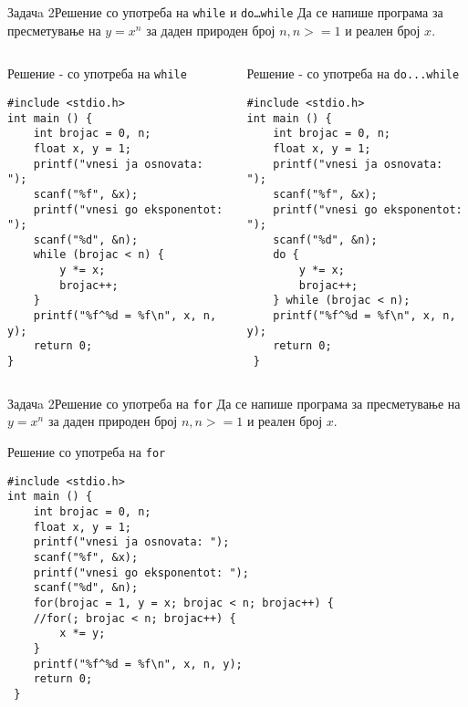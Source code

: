 \begin{frame}[fragile]{Задачa 2}{Решение со употреба на \texttt{while} и
\texttt{do\ldots while}} Да се напише програма за пресметување на $y = x^n$ за
даден природен број $n, n>=1$ и реален број $x$.
\pause
\begin{columns}
\begin{exampleblock}{Решение - со употреба на \texttt{while}}
\begin{lstlisting}
#include <stdio.h> 
int main () { 
    int brojac = 0, n; 
    float x, y = 1; 
    printf("vnesi ja osnovata: "); 
    scanf("%f", &x); 
    printf("vnesi go eksponentot: "); 
    scanf("%d", &n);    
    while (brojac < n) { 
        y *= x; 
        brojac++; 
    } 
    printf("%f^%d = %f\n", x, n, y); 
    return 0; 
}
\end{lstlisting}
\end{exampleblock}
\pause
{}
\begin{exampleblock}{Решение - со употреба на \texttt{do...while}}
\begin{lstlisting}
#include <stdio.h> 
int main () { 
    int brojac = 0, n; 
    float x, y = 1; 
    printf("vnesi ja osnovata: "); 
    scanf("%f", &x); 
    printf("vnesi go eksponentot: "); 
    scanf("%d", &n); 
    do { 
        y *= x; 
        brojac++; 
    } while (brojac < n); 
    printf("%f^%d = %f\n", x, n, y); 
    return 0; 
 }
\end{lstlisting}
\end{exampleblock}
\end{columns}
\end{frame}

\begin{frame}[fragile]{Задачa 2}{Решение со употреба на \texttt{for}}
Да се напише програма за пресметување на $y = x^n$ за даден природен број $n,
n>=1$ и реален број $x$.
\pause
\begin{exampleblock}{Решение со употреба на \texttt{for}}
\begin{lstlisting}
#include <stdio.h> 
int main () { 
    int brojac = 0, n; 
    float x, y = 1; 
    printf("vnesi ja osnovata: "); 
    scanf("%f", &x); 
    printf("vnesi go eksponentot: "); 
    scanf("%d", &n); 
    for(brojac = 1, y = x; brojac < n; brojac++) {
    //for(; brojac < n; brojac++) {
        x *= y;
    } 
    printf("%f^%d = %f\n", x, n, y); 
    return 0; 
 }
\end{lstlisting}
\end{exampleblock}
\end{frame}


